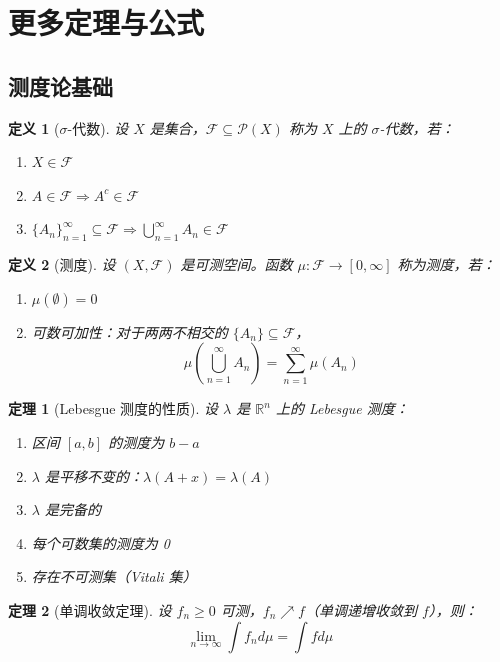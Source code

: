 \documentclass[12pt]{article}
\newtheorem{theorem}{定理}[section]
\newtheorem{definition}{定义}[section]
\begin{document}
\section{更多定理与公式}

\subsection{测度论基础}

\begin{definition}[$\sigma$-代数]
设 $X$ 是集合，$\mathcal{F} \subseteq \mathcal{P}(X)$ 称为 $X$ 上的 $\sigma$-代数，若：
\begin{enumerate}
\item $X \in \mathcal{F}$
\item $A \in \mathcal{F} \Rightarrow A^c \in \mathcal{F}$
\item $\{A_n\}_{n=1}^{\infty} \subseteq \mathcal{F} \Rightarrow \bigcup_{n=1}^{\infty} A_n \in \mathcal{F}$
\end{enumerate}
\end{definition}

\begin{definition}[测度]
设 $(X, \mathcal{F})$ 是可测空间。函数 $\mu: \mathcal{F} \to [0, \infty]$ 称为测度，若：
\begin{enumerate}
\item $\mu(\emptyset) = 0$
\item 可数可加性：对于两两不相交的 $\{A_n\} \subseteq \mathcal{F}$，
$$\mu\left(\bigcup_{n=1}^{\infty} A_n\right) = \sum_{n=1}^{\infty} \mu(A_n)$$
\end{enumerate}
\end{definition}

\begin{theorem}[Lebesgue 测度的性质]
设 $\lambda$ 是 $\mathbb{R}^n$ 上的 Lebesgue 测度：
\begin{enumerate}
\item 区间 $[a, b]$ 的测度为 $b - a$
\item $\lambda$ 是平移不变的：$\lambda(A + x) = \lambda(A)$
\item $\lambda$ 是完备的
\item 每个可数集的测度为 0
\item 存在不可测集（Vitali 集）
\end{enumerate}
\end{theorem}

\begin{theorem}[单调收敛定理]
设 $f_n \geq 0$ 可测，$f_n \nearrow f$（单调递增收敛到 $f$），则：
$$\lim_{n \to \infty} \int f_n d\mu = \int f d\mu$$
\end{theorem}
\end{document}
